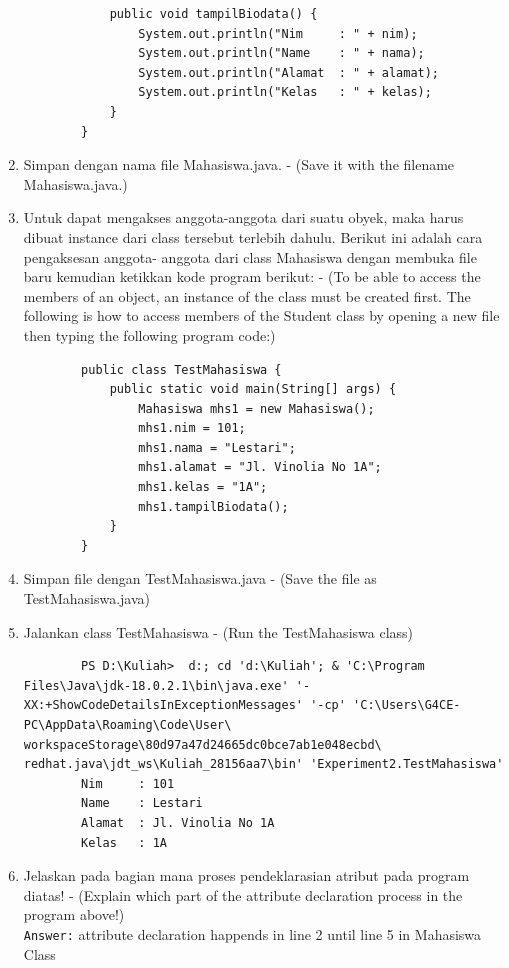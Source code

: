 \documentclass[12pt,titlepage]{article}
\begin{document}
\begin{enumerate}
\begin{verbatim}
            public void tampilBiodata() {
                System.out.println("Nim     : " + nim);
                System.out.println("Name    : " + nama);
                System.out.println("Alamat  : " + alamat);
                System.out.println("Kelas   : " + kelas);
            }
        }
    \end{verbatim}
    \item Simpan dengan nama file Mahasiswa.java. - (Save it with the filename Mahasiswa.java.)
    \item Untuk dapat mengakses anggota-anggota dari suatu obyek, maka harus dibuat instance dari class tersebut terlebih dahulu. Berikut ini adalah cara pengaksesan anggota- anggota dari class Mahasiswa dengan membuka file baru kemudian ketikkan kode program berikut: - (To be able to access the members of an object, an instance of the class must be created first. The following is how to access members of the Student class by opening a new file then typing the following program code:)
    \begin{verbatim}
        public class TestMahasiswa {
            public static void main(String[] args) {
                Mahasiswa mhs1 = new Mahasiswa();
                mhs1.nim = 101;
                mhs1.nama = "Lestari";
                mhs1.alamat = "Jl. Vinolia No 1A";
                mhs1.kelas = "1A";
                mhs1.tampilBiodata();
            }
        }
    \end{verbatim}
    \item Simpan file dengan TestMahasiswa.java - (Save the file as TestMahasiswa.java)
    \item Jalankan class TestMahasiswa - (Run the TestMahasiswa class)
    \begin{verbatim}
        PS D:\Kuliah>  d:; cd 'd:\Kuliah'; & 'C:\Program Files\Java\jdk-18.0.2.1\bin\java.exe' '-XX:+ShowCodeDetailsInExceptionMessages' '-cp' 'C:\Users\G4CE-PC\AppData\Roaming\Code\User\ workspaceStorage\80d97a47d24665dc0bce7ab1e048ecbd\ redhat.java\jdt_ws\Kuliah_28156aa7\bin' 'Experiment2.TestMahasiswa'
        Nim     : 101
        Name    : Lestari
        Alamat  : Jl. Vinolia No 1A
        Kelas   : 1A
    \end{verbatim}
    \item Jelaskan pada bagian mana proses pendeklarasian atribut pada program diatas! - (Explain which part of the attribute declaration process in the program above!) \\
    \texttt{Answer:} attribute declaration happends in line 2 until line 5 in Mahasiswa Class

\end{enumerate}
\end{document}
